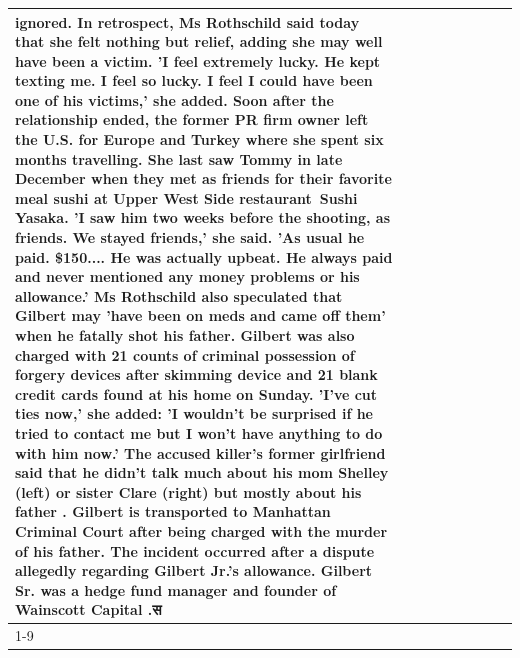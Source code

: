 \begin{table}[H]
\begin{tabular}{lllrlllll}
ignored. In retrospect, Ms Rothschild said today that she felt nothing but relief, adding she may well have been a victim. 'I feel extremely lucky. He kept texting me. I feel so lucky. I feel I could have been one of his victims,' she added. Soon after the relationship ended, the former PR firm owner left the U.S. for Europe and Turkey where she spent six months  travelling. She last saw Tommy in late December when they met as friends for their favorite meal sushi at Upper West Side restaurant Sushi Yasaka. 'I saw him two weeks before the shooting, as friends. We stayed friends,' she said. 'As usual he paid. \$150.... He was actually upbeat. He always paid and never mentioned any money problems or his allowance.' Ms Rothschild also speculated that Gilbert may 'have been on meds and came off them' when he fatally shot his father. Gilbert was also charged with 21 counts of criminal possession of forgery devices after skimming device and 21 blank credit cards found at his home on Sunday. 'I've cut ties now,' she added: 'I wouldn’t be surprised if he tried to contact me but I won’t have anything to do with him now.' The accused killer's former girlfriend said that he didn't talk much about his mom Shelley (left) or sister Clare (right) but mostly about his father . Gilbert is transported to Manhattan Criminal Court  after being charged with the murder of his father. The incident occurred after a dispute allegedly regarding Gilbert Jr.'s allowance. Gilbert Sr. was a hedge fund manager and founder of Wainscott Capital .स \\
\cline{1-9}

\end{tabular}
\end{table}
